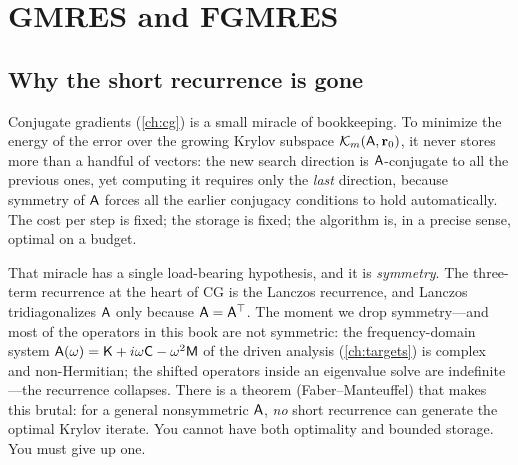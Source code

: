 \chapter{GMRES and FGMRES}
\label{ch:gmres}


\section{Why the short recurrence is gone}

Conjugate gradients (\cref{ch:cg}) is a small miracle of bookkeeping. To minimize
the energy of the error over the growing Krylov subspace $\mathcal{K}_m(\mathsf{A},
\mathbf{r}_0)$, it never stores more than a handful of vectors: the new search direction
is $\mathsf{A}$-conjugate to all the previous ones, yet computing it requires only
the \emph{last} direction, because symmetry of $\mathsf{A}$ forces all the earlier
conjugacy conditions to hold automatically. The cost per step is fixed; the
storage is fixed; the algorithm is, in a precise sense, optimal on a budget.

That miracle has a single load-bearing hypothesis, and it is \emph{symmetry}. The
three-term recurrence at the heart of CG is the Lanczos recurrence, and Lanczos
tridiagonalizes $\mathsf{A}$ only because $\mathsf{A}=\mathsf{A}^{\top}$. The moment we drop
symmetry---and most of the operators in this book are not symmetric: the
frequency-domain system $\mathsf{A}(\omega)=\mathsf{K}+i\omega\mathsf{C}-\omega^2\mathsf{M}$ of
the driven analysis (\cref{ch:targets}) is complex and non-Hermitian; the shifted
operators inside an eigenvalue solve are indefinite---the recurrence collapses.
There is a theorem (Faber--Manteuffel) that makes this brutal: for a general
nonsymmetric $\mathsf{A}$, \emph{no} short recurrence can generate the optimal Krylov
iterate. You cannot have both optimality and bounded storage. You must give up one.

